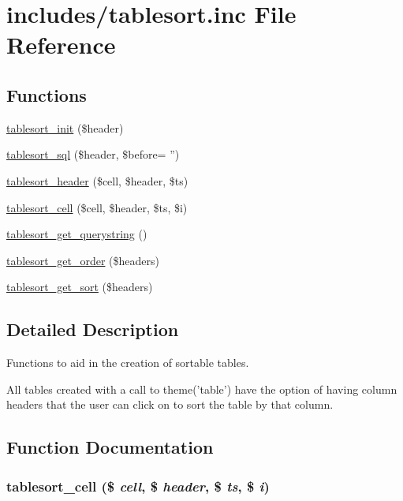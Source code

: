 \hypertarget{tablesort_8inc}{
\section{includes/tablesort.inc File Reference}
\label{tablesort_8inc}
}
\subsection*{Functions}
\begin{CompactItemize}
\item 
\hyperlink{tablesort_8inc_fee7fc97d83c8e51399e9b41ccbae927}{tablesort\_\-init} (\$header)
\item 
\hyperlink{group__database_gd893ca6e60341e448203269c520696ce}{tablesort\_\-sql} (\$header, \$before= '')
\item 
\hyperlink{tablesort_8inc_9c93c8e235c5013f0f494ba207ec1bdf}{tablesort\_\-header} (\$cell, \$header, \$ts)
\item 
\hyperlink{tablesort_8inc_32db61218906caa4bd22dffeb6bd5e00}{tablesort\_\-cell} (\$cell, \$header, \$ts, \$i)
\item 
\hyperlink{tablesort_8inc_028ba1bfddfb391f52b8795d17e5593f}{tablesort\_\-get\_\-querystring} ()
\item 
\hyperlink{tablesort_8inc_185527ebc6d0d3f4b8681b60debddf21}{tablesort\_\-get\_\-order} (\$headers)
\item 
\hyperlink{tablesort_8inc_e0824a39d518b2e6dc8e603093be2146}{tablesort\_\-get\_\-sort} (\$headers)
\end{CompactItemize}


\subsection{Detailed Description}
Functions to aid in the creation of sortable tables.

All tables created with a call to theme('table') have the option of having column headers that the user can click on to sort the table by that column. 

\subsection{Function Documentation}
\hypertarget{tablesort_8inc_32db61218906caa4bd22dffeb6bd5e00}{
\subsubsection[{tablesort\_\-cell}]{\setlength{\rightskip}{0pt plus 5cm}tablesort\_\-cell (\$ {\em cell}, \/  \$ {\em header}, \/  \$ {\em ts}, \/  \$ {\em i})}}
\label{tablesort_8inc_32db61218906caa4bd22dffeb6bd5e00}


